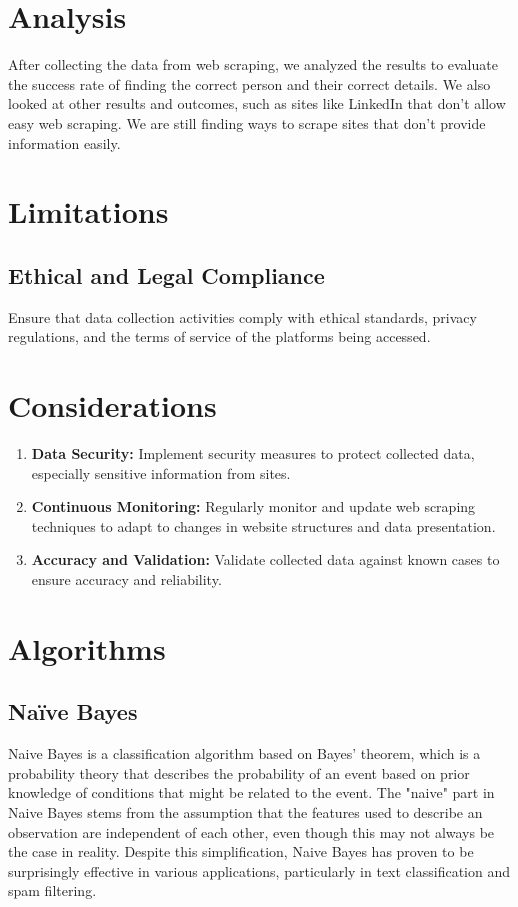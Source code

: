 \documentclass[openany]{report}
\begin{document}
\section{Analysis}
After collecting the data from web scraping, we analyzed the results to evaluate the success rate of finding the correct person and their correct details. We also looked at other results and outcomes, such as sites like LinkedIn that don't allow easy web scraping. We are still finding ways to scrape sites that don't provide information easily.
\section{Limitations}
\subsection{Ethical and Legal Compliance}
Ensure that data collection activities comply with ethical standards, privacy regulations, and the terms of service of the platforms being accessed.

\section{Considerations}
\begin{enumerate}
    \item \textbf{Data Security:} Implement security measures to protect collected data, especially sensitive information from sites.
    \item \textbf{Continuous Monitoring:} Regularly monitor and update web scraping techniques to adapt to changes in website structures and data presentation.
    \item \textbf{Accuracy and Validation:} Validate collected data against known cases to ensure accuracy and reliability.
\end{enumerate}
\section{Algorithms}

\subsection{Naïve Bayes}
Naive Bayes is a classification algorithm based on Bayes' theorem, which is a probability theory that describes the probability of an event based on prior knowledge of conditions that might be related to the event. The "naive" part in Naive Bayes stems from the assumption that the features used to describe an observation are independent of each other, even though this may not always be the case in reality. Despite this simplification, Naive Bayes has proven to be surprisingly effective in various applications, particularly in text classification and spam filtering.
\end{document}
